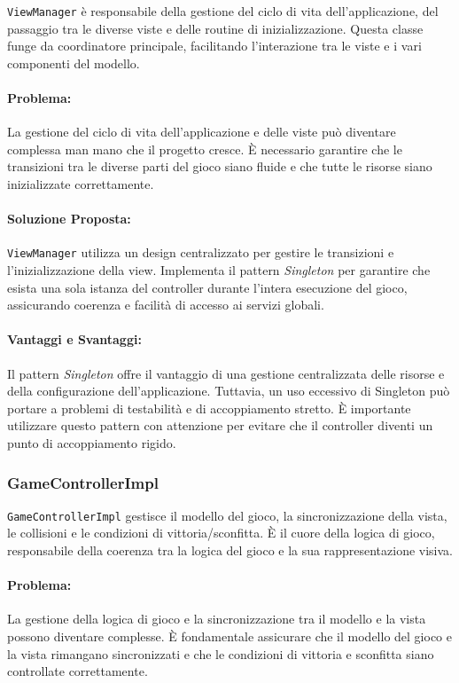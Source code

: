 \documentclass[a4paper,12pt]{report}
\begin{document}
	\texttt{ViewManager} è responsabile della gestione del ciclo di vita dell'applicazione, del passaggio tra le diverse viste e delle routine di inizializzazione. Questa classe funge da coordinatore principale, facilitando l'interazione tra le viste e i vari componenti del modello.
	
	\paragraph{Problema:} La gestione del ciclo di vita dell'applicazione e delle viste può diventare complessa man mano che il progetto cresce. È necessario garantire che le transizioni tra le diverse parti del gioco siano fluide e che tutte le risorse siano inizializzate correttamente.
	
	\paragraph{Soluzione Proposta:} \texttt{ViewManager} utilizza un design centralizzato per gestire le transizioni e l'inizializzazione della view. Implementa il pattern \textit{Singleton} per garantire che esista una sola istanza del controller durante l'intera esecuzione del gioco, assicurando coerenza e facilità di accesso ai servizi globali.
	
	\paragraph{Vantaggi e Svantaggi:} 
	Il pattern \textit{Singleton} offre il vantaggio di una gestione centralizzata delle risorse e della configurazione dell'applicazione. Tuttavia, un uso eccessivo di Singleton può portare a problemi di testabilità e di accoppiamento stretto. È importante utilizzare questo pattern con attenzione per evitare che il controller diventi un punto di accoppiamento rigido.
	
	\subsubsection{GameControllerImpl}
	
	\texttt{GameControllerImpl} gestisce il modello del gioco, la sincronizzazione della vista, le collisioni e le condizioni di vittoria/sconfitta. È il cuore della logica di gioco, responsabile della coerenza tra la logica del gioco e la sua rappresentazione visiva.
	
	\paragraph{Problema:} La gestione della logica di gioco e la sincronizzazione tra il modello e la vista possono diventare complesse. È fondamentale assicurare che il modello del gioco e la vista rimangano sincronizzati e che le condizioni di vittoria e sconfitta siano controllate correttamente.
	
\end{document}
